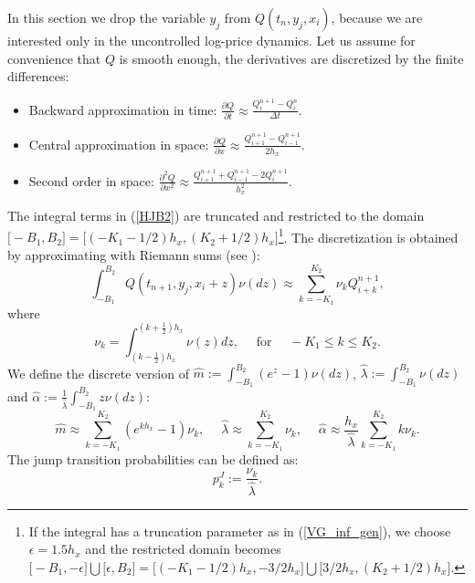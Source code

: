 In this section we drop the variable $y_j$ from $Q(t_n,y_j,x_i)$, because we are interested only in the uncontrolled log-price dynamics.
Let us assume for convenience that $Q$ is smooth enough, the derivatives are discretized by the finite differences:
\begin{itemize}
 \item Backward approximation in time: 
 $ \frac{\partial Q}{\partial t} \approx \frac{Q^{n+1}_{i} - Q^{n}_{i}}{\Delta t} $.
 \item Central approximation in space: 
 $ \frac{\partial Q}{\partial x} \approx \frac{Q^{n+1}_{i+1} - Q^{n+1}_{i-1}}{2 h_x} $.
 \item Second order in space:   
 $ \frac{\partial^2 Q}{\partial x^2} \approx \frac{Q^{n+1}_{i+1} + Q^{n+1}_{i-1} -2 Q^{n+1}_{i}}{h_x^2} $.
\end{itemize}
The integral terms in (\ref{HJB2}) are truncated and restricted to the domain 
$ \bigl[-B_1,B_2\bigr] = \bigl[ ( -K_1-1/2 )h_x , ( K_2+1/2 )h_x \bigr] $\footnote{If the integral has a truncation parameter as in (\ref{VG_inf_gen}), 
we choose $\epsilon = 1.5h_x$ and the 
restricted domain becomes $ \bigl[-B_1,-\epsilon \bigr]\bigcup \bigl[\epsilon,B_2 \bigr] = \bigl[ ( -K_1-1/2 )h_x , -3/2 h_x \bigr] \bigcup \bigl[ 3/2 h_x, ( K_2+1/2 )h_x \bigr] $. }.
The discretization is obtained by approximating with Riemann sums (see \cite{CoVo05b}):
\begin{equation}\label{trap_quad}
  \int_{-B_1}^{B_2}  Q(t_{n+1},y_j,x_i +z) \nu(dz) \approx \sum_{k = -K_1}^{K_2} \nu_k Q^{n+1}_{i+k}, 
\end{equation}
where
\begin{equation}\label{nu1}
 \nu_k = \int_{(k-\frac{1}{2}) h_x}^{(k+\frac{1}{2}) h_x} \nu(z) dz, \hspace{1em} \mbox{ for } \hspace{1em} -K_1 \leq k \leq K_2. 
\end{equation}
We define the discrete version of $\hat m := \int_{-B_1}^{B_2} (e^z-1) \nu(dz)$, $\hat \lambda := \int_{-B_1}^{B_2} \nu(dz)$ 
and $\hat \alpha := \frac{1}{\hat \lambda} \int_{-B_1}^{B_2} z \nu(dz)$: 
\begin{equation}
 \hat m \approx \sum_{k = -K_1}^{K_2} (e^{kh_x}-1) \nu_k, \quad \;
 \hat \lambda \approx \sum_{k = -K_1}^{K_2} \nu_k,  \quad \;
 \hat \alpha \approx \frac{h_x}{\hat \lambda} \sum_{k = -K_1}^{K_2} k \nu_k.
\end{equation}
The jump transition probabilities can be defined as:
\begin{equation}\label{pJ}
 p^J_k := \frac{\nu_k}{\hat \lambda}. 
\end{equation}
